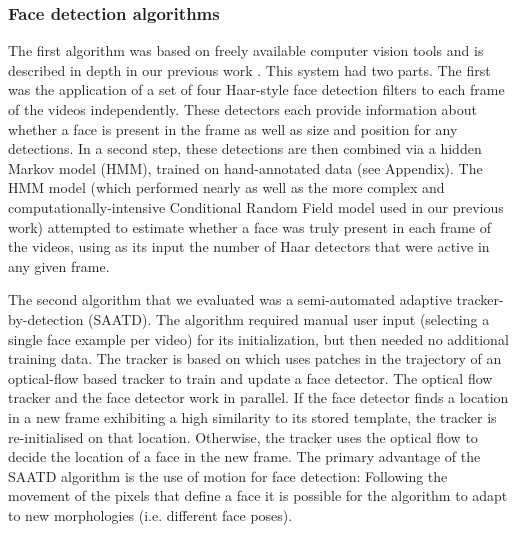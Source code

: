 \documentclass[10pt,letterpaper]{article}
\begin{document}
\subsubsection{Face detection algorithms}

The first algorithm was based on freely available computer vision tools \cite{bradski2008} and is described in depth in our previous work \cite{frank2012b}. This system had two parts. The first was the application of a set of four Haar-style face detection filters \cite{viola2004} to each frame of the videos independently. These detectors each provide information about whether a face is present in the frame as well as size and position for any detections. In a second step, these detections are then combined via a hidden Markov model (HMM), trained on hand-annotated data (see Appendix). The HMM model (which performed nearly as well as the more complex and computationally-intensive Conditional Random Field model used in our previous work) attempted to estimate whether a face was truly present in each frame of the videos, using as its input the number of Haar detectors that were active in any given frame. 

The second algorithm that we evaluated was a semi-automated adaptive tracker-by-detection (SAATD). The algorithm required manual user input (selecting a single face example per video) for its initialization, but then needed no additional training data. The tracker is based on  which uses patches in the trajectory of an optical-flow based tracker \cite{lucas1981} to train and update a face detector. The optical flow tracker and the face detector work in parallel. 
If the face detector finds a location in a new frame exhibiting a high similarity to its stored template, the tracker is re-initialised on that location. Otherwise, the tracker uses the optical flow to decide the location of a face in the new frame.
The primary advantage of the SAATD algorithm is the use of motion for face detection: Following the movement of the pixels that define a face it is possible for the algorithm to adapt to new morphologies (i.e. different face poses). 


\end{document}
